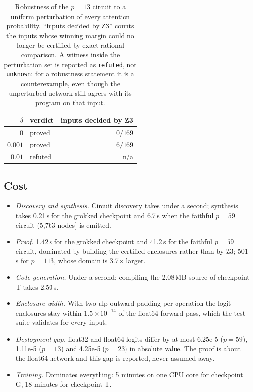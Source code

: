 \documentclass[11pt]{article}
\newcommand{\code}[1]{\texttt{#1}}
\begin{document}
\begin{table}[t]
\centering
\small
\begin{tabular}{@{}rlr@{}}
\toprule
$\delta$ & verdict & inputs decided by Z3 \\
\midrule
$0$ & proved & $0/169$ \\
$0.001$ & proved & $6/169$ \\
$0.01$ & refuted & n/a \\
\bottomrule
\end{tabular}
\caption{Robustness of the $p=13$ circuit to a uniform perturbation of every attention probability. ``inputs decided by Z3'' counts the inputs whose winning margin could no longer be certified by exact rational comparison. A witness inside the perturbation set is reported as \code{refuted}, not \code{unknown}: for a robustness statement it is a counterexample, even though the unperturbed network still agrees with its program on that input.}\label{tab:robustness}
\end{table}

\subsection{Cost}

\begin{itemize}[leftmargin=1.4em,itemsep=2pt]
  \item \emph{Discovery and synthesis.} Circuit discovery takes under a second; synthesis takes 0.21\,s for the grokked checkpoint and 6.7\,s when the faithful $p=59$ circuit (5,763 nodes) is emitted.
  \item \emph{Proof.} 1.42\,s for the grokked checkpoint and 41.2\,s for the faithful $p=59$ circuit, dominated by building the certified enclosures rather than by Z3; 501\,s for $p=113$, whose domain is 3.7$\times$ larger.
  \item \emph{Code generation.} Under a second; compiling the 2.08\,MB source of checkpoint T takes 2.50\,s.
  \item \emph{Enclosure width.} With two-ulp outward padding per operation the logit enclosures stay within $1.5\times10^{-14}$ of the float64 forward pass, which the test suite validates for every input.
  \item \emph{Deployment gap.} float32 and float64 logits differ by at most 6.25e-5 ($p=59$), 1.11e-5 ($p=13$) and 4.25e-5 ($p=23$) in absolute value. The proof is about the float64 network and this gap is reported, never assumed away.
  \item \emph{Training.} Dominates everything: 5 minutes on one CPU core for checkpoint G, 18 minutes for checkpoint T.
\end{itemize}
\end{document}
